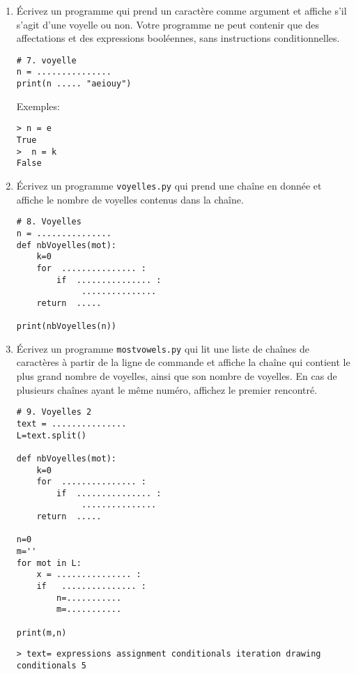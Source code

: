 \documentclass[a4paper]{article}
\begin{document}
\begin{enumerate}
\item Écrivez un programme qui prend un caractère comme argument et affiche s'il s'agit d'une voyelle ou non.
Votre programme ne peut contenir que des affectations et des expressions booléennes, sans instructions conditionnelles.
\begin{lstlisting}
# 7. voyelle
n = ...............
print(n ..... "aeiouy")
\end{lstlisting}
Exemples:
\begin{verbatim}
> n = e
True
>  n = k
False
\end{verbatim}

\item Écrivez un programme {\tt voyelles.py} qui prend une chaîne en donnée et affiche le nombre de voyelles contenus dans la chaîne.

\begin{lstlisting}
# 8. Voyelles
n = ...............
def nbVoyelles(mot):
    k=0
    for  ............... :
        if  ............... :
             ...............
    return  .....

print(nbVoyelles(n))
\end{lstlisting}

\item Écrivez un programme {\tt mostvowels.py} qui lit une liste de chaînes de caractères à partir de la ligne de commande et affiche la chaîne qui contient le plus grand nombre de voyelles, ainsi que son nombre de voyelles. En cas de plusieurs chaînes ayant le même numéro, affichez le premier rencontré.
\begin{lstlisting}
# 9. Voyelles 2
text = ...............
L=text.split()

def nbVoyelles(mot):
    k=0
    for  ............... :
        if  ............... :
             ...............
    return  .....

n=0
m=''
for mot in L:
    x = ............... :
    if   ............... :
        n=...........
        m=...........

print(m,n)
\end{lstlisting}

\begin{verbatim}
> text= expressions assignment conditionals iteration drawing
conditionals 5
\end{verbatim}


\end{enumerate}
\end{document}
